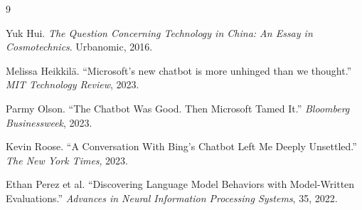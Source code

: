 \documentclass[12pt,a4paper]{article}
\begin{document}

\begin{thebibliography}{9}

Yuk Hui.
\newblock \emph{The Question Concerning Technology in China: An Essay in Cosmotechnics}.
\newblock Urbanomic, 2016.

Melissa Heikkil\"a.
\newblock ``Microsoft's new chatbot is more unhinged than we thought.''
\newblock \emph{MIT Technology Review}, 2023.

Parmy Olson.
\newblock ``The Chatbot Was Good. Then Microsoft Tamed It.''
\newblock \emph{Bloomberg Businessweek}, 2023.

Kevin Roose.
\newblock ``A Conversation With Bing's Chatbot Left Me Deeply Unsettled.''
\newblock \emph{The New York Times}, 2023.

Ethan Perez et al.
\newblock ``Discovering Language Model Behaviors with Model-Written Evaluations.''
\newblock \emph{Advances in Neural Information Processing Systems}, 35, 2022.

\end{thebibliography}
\end{document}

